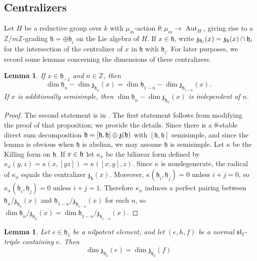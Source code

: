 \documentclass{article} %
\newtheorem{lemma}[proposition]{Lemma}
\numberwithin{equation}{section}
\theoremstyle{definition}
\DeclareMathOperator{\Aut}{Aut}
\newcommand{\Z}{\mathbb{Z}}
\newcommand{\frakh}{\mathfrak h}
\newcommand{\frakz}{\mathfrak z}
\newcommand{\fraksl}{\mathfrak{sl}}
\begin{document}
\subsection{Centralizers}

Let $H$ be a reductive group over $k$ with $\mu_m$-action $\theta\colon \mu_m \rightarrow \Aut_H$, giving rise to a $\Z/m\Z$-grading $\frakh = \oplus \frakh_i$ on the Lie algebra of $H$.
If $x\in \frakh$, write $\frak{z}_{\frakh_i}(x) = \frakz_{\frakh}(x)\cap \frakh_i$ for the intersection of the centralizer of $x$ in $\frakh$ with $\frakh_i$.
For later purposes, we record some lemmas concerning the dimensions of these centralizers.


\begin{lemma}\label{lem-pany}
If $x \in \frakh_{-1}$ and $n\in \Z$, then 
\begin{equation*}
    \dim \frakh_n - \dim \frakz_{\frakh_n}(x) = \dim \frakh_{1-n} - \dim \frakz_{\frakh_{1 - n}}(x).
\end{equation*}
If $x$ is additionally semisimple, then $\dim \frakh_n - \dim \frakz_{\frakh_n}(x)$ is independent of $n$.
\end{lemma}
\begin{proof}
The second statement is in \cite[Proposition 2.1]{Panyushev-Invarianttheorythetagroups}. The first statement follows from modifying the proof of that proposition; we provide the details.
Since there is a $\theta$-stable direct sum decomposition $\frakh = [\frakh,\frakh] \oplus \frak{z}(\frakh)$ with $[\frakh,\frakh]$ semisimple, and since the lemma is obvious when $\frakh$ is abelian, we may assume $\frakh$ is semisimple.
Let $\kappa$ be the Killing form on $\frakh$.
If $x\in \frak{h}$ let $\kappa_x$ be the bilinear form defined by $\kappa_x(y, z) = \kappa(x, [yz]) = \kappa([x,y],z)$. 
Since $\kappa$ is nondegenerate, the radical of $\kappa_x$ equals the centralizer $\frakz_\frakh(x)$. 
Moreover, $\kappa(\frakh_i , \frakh_j) = 0$ unless $i+ j =0$, so $\kappa_x(\frakh_i, \frakh_j) = 0$ unless $i + j = 1$. 
Therefore $\kappa_x$ induces a perfect pairing between $\frakh_n/\frakz_{\frakh_n}(x)$ and $\frakh_{1-n}/\frakz_{\frakh_{1-n}}(x)$ for each $n$, so $\dim \frakh_n/\frakz_{\frakh_n}(x) = \dim \frakh_{1 - n}/\frakz_{\frakh_{1 - n}}(x)$.
\end{proof}

\begin{lemma}\label{lem-ef-centralizer} 
Let $e \in \frakh_1$ be a nilpotent element, and let $(e, h, f)$ be a normal $\fraksl_2$-triple containing $e$. Then 
\begin{equation*}
\dim \frakz_{\frakh_0}(e) = \dim \frakz_{\frakh_0}(f)
\end{equation*}
\end{lemma}
\end{document}
